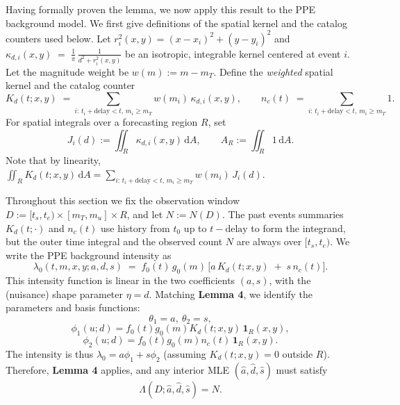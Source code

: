 \documentclass[linenum,doublespace,onecolumn]{SSA-SRL}
\theoremstyle{lemma}
\begin{document}
Having formally proven the lemma, we now apply this result to the PPE background model.
We first give definitions of the spatial kernel and the catalog counters used below.
Let $r_i^2(x,y)=(x-x_i)^2+(y-y_i)^2$ and
$
\kappa_{d,i}(x,y)\;=\;\frac{1}{\pi}\,\frac{1}{d^2+r_i^2(x,y)}
$
be an isotropic, integrable kernel centered at event $i$.
Let the magnitude weight be $w(m):=m-m_T$. Define the \emph{weighted} spatial kernel and the catalog counter
\[
K_d(t;x,y)\;=\!\!\sum_{i:\,t_i+\text{delay}<t,\,m_i\ge m_T}\! w(m_i)\,\kappa_{d,i}(x,y),
\qquad
n_c(t)\;=\!\!\sum_{i:\,t_i+\text{delay}<t,\,m_i\ge m_T}\! 1.
\]
For spatial integrals over a forecasting region $R$, set
\[
J_i(d):=\iint_R \kappa_{d,i}(x,y)\,\mathrm{d}A,
\qquad
A_R:=\iint_R 1\,\mathrm{d}A .
\]
Note that by linearity,
$
\iint_R K_d(t;x,y)\,\mathrm{d}A
=\sum_{i:\,t_i+\text{delay}<t,\,m_i\ge m_T} w(m_i)\,J_i(d).
$

Throughout this section we fix the observation window $D := [t_s,t_e)\times[m_T,m_u]\times R$, and let $N := N(D)$. The past events summaries $K_d(t;\cdot)$ and $n_c(t)$ use history from $t_0$ up to $t-\text{delay}$ to form the integrand, but the outer time integral and the observed count $N$ are always over $[t_s,t_e)$. We write the PPE background intensity as
\[
\lambda_0(t,m,x,y; a,d,s)\;=\; f_0(t)\,g_0(m)\,\Big[a\,K_d(t;x,y)\;+\;s\,n_c(t)\Big].
\]
This intensity function is linear in the two coefficients $(a,s)$, with the (nuisance) shape parameter $\eta=d$.
Matching \textbf{Lemma 4}, we identify the parameters and basis functions:
\[
\theta_1=a,\ \theta_2=s,
\]
\[
\phi_1(u;d)=f_0(t)g_0(m)K_d(t;x,y)\,\mathbf{1}_R(x,y),
\]
\[
\phi_2(u;d)=f_0(t)g_0(m)n_c(t)\,\mathbf{1}_R(x,y).
\]
The intensity is thus $\lambda_0=a\phi_1+s\phi_2$ (assuming $K_d(t;x,y)=0$ outside $R$). Therefore, \textbf{Lemma 4} applies, and any interior MLE $(\hat a,\hat d,\hat s)$ must satisfy
\[
\boxed{\Lambda(D;\hat a,\hat d,\hat s)=N}.
\]
\end{document}
